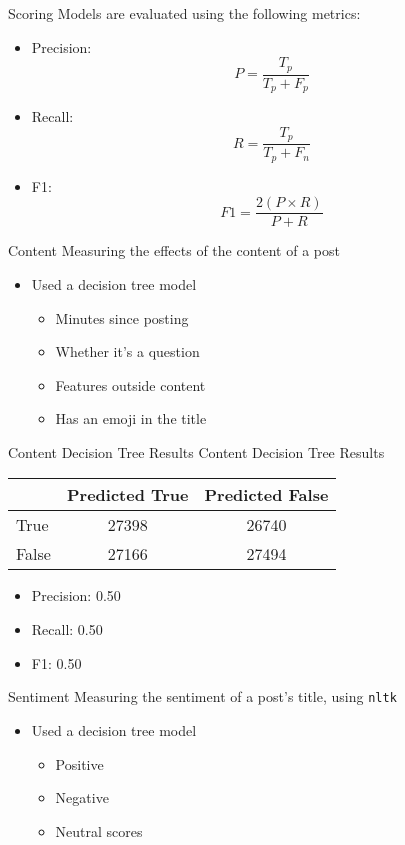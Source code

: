 \documentclass[10pt,t]{beamer}
\newcommand{\bi}{\begin{itemize}}                                 %
\newcommand{\ei}{\end{itemize}}                                   %
\begin{document}
\begin{frame}{Scoring}
Models are evaluated using the following metrics:
	\bi
		\item Precision: \begin{equation}P = \frac{T_{p}}{T_{p} + F_{p}}\end{equation}
		\item Recall: \begin{equation}R = \frac{T_{p}}{T_{p} + F_{n}}\end{equation}
		\item F1:\begin{equation}F1 = \frac{2(P \times R)}{P + R}\end{equation}
	\ei
\end{frame}

\begin{frame}{Content}
Measuring the effects of the content of a post
	\bi
		\item Used a decision tree model
		\bi
		\item Minutes since posting
		\item Whether it's a question
		\item Features outside content
		\item Has an emoji in the title
		\ei
	\ei
\end{frame}

\begin{frame}[c]{Content Decision Tree Results}
Content Decision Tree Results
\begin{table}
	\begin{tabular}{l | c | c }
		& Predicted True & Predicted False\\
		\hline \hline
		True & 27398 & 26740\\ 
		False & 27166 & 27494
	\end{tabular}
\end{table}
\bi
	\item Precision: 0.50
	\item Recall: 0.50
	\item F1: 0.50
\ei
\end{frame}

\begin{frame}{Sentiment}
Measuring the sentiment of a post's title, using \texttt{nltk}
	\bi
		\item Used a decision tree model
		\bi
			\item Positive
			\item Negative
			\item Neutral scores
		\ei
	\ei
\end{frame}
\end{document}

